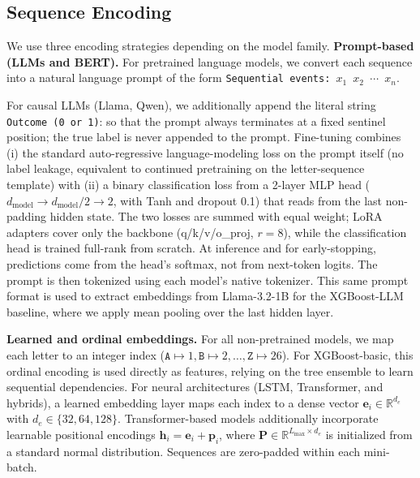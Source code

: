 \documentclass{article}
\theoremstyle{plain}
\theoremstyle{definition}
\theoremstyle{remark}
\begin{document}
\subsection{Sequence Encoding}
\label{subsec:encoding}
We use three encoding strategies depending on the model family. \textbf{Prompt-based (LLMs and BERT).} For pretrained language models, we convert each sequence into a natural language prompt of the form \texttt{Sequential events: $x_1$ $x_2$ $\cdots$ $x_n$}. 

For causal LLMs (Llama, Qwen), we additionally append the literal string \texttt{Outcome (0 or 1)}: so that the prompt always terminates at a fixed sentinel position; the true label is never appended to the prompt. Fine-tuning combines (i) the standard auto-regressive language-modeling loss on the prompt itself (no label leakage, equivalent to continued pretraining on the letter-sequence template) with (ii) a binary classification loss from a 2-layer MLP head ($d_{\text{model}} \to d_{\text{model}}/2 \to 2$, with Tanh and dropout 0.1) that reads from the last non-padding hidden state. The two losses are summed with equal weight; LoRA adapters cover only the backbone (q/k/v/o\_proj, $r{=}8$), while the classification head is trained full-rank from scratch. At inference and for early-stopping, predictions come from the head's softmax, not from next-token logits. The prompt is then tokenized using each model's native tokenizer. This same prompt format is used to extract embeddings from Llama-3.2-1B for the XGBoost-LLM baseline, where we apply mean pooling over the last hidden layer.

\textbf{Learned and ordinal embeddings.} For all non-pretrained models, we map each letter to an integer index ($\texttt{A} \mapsto 1, \texttt{B} \mapsto 2, \ldots, \texttt{Z} \mapsto 26$). For XGBoost-basic, this ordinal encoding is used directly as features, relying on the tree ensemble to learn sequential dependencies. For neural architectures (LSTM, Transformer, and hybrids), a learned embedding layer maps each index to a dense vector $\mathbf{e}_i \in \mathbb{R}^{d_e}$ with $d_e \in \{32, 64, 128\}$. Transformer-based models additionally incorporate learnable positional encodings $\mathbf{h}_i = \mathbf{e}_i + \mathbf{p}_i$, where $\mathbf{P} \in \mathbb{R}^{L_{\max} \times d_e}$ is initialized from a standard normal distribution. Sequences are zero-padded within each mini-batch.
\end{document}

